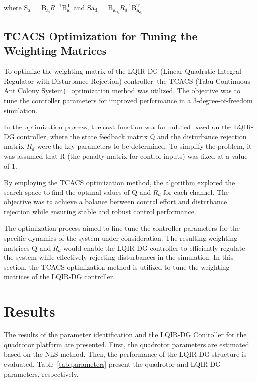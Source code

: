 \documentclass[3p]{elsarticle}
\begin{document}
where $
    \boldsymbol{\mathrm{S_{a_i}}} = \boldsymbol{\mathrm{B_{a_i}}}R^{-1}\boldsymbol{\mathrm{B}^\mathrm{T}_{a_i}}$ and $
    \boldsymbol{\mathrm{S{a_{d_i}}}} = \boldsymbol{\mathrm{B}_{a_{d_i}}}R_{d}^{-1}\boldsymbol{\mathrm{B}^\mathrm{T}_{a_{d_i}}}.
$%

\subsection{TCACS Optimization for Tuning the Weighting Matrices}
\noindent To optimize the weighting matrix of the LQIR-DG (Linear Quadratic Integral Regulator with Disturbance Rejection) controller, the TCACS (Tabu Continuous Ant Colony System)~\cite{10.1007/978-3-540-28646-2_27} optimization method was utilized. The objective was to tune the controller parameters for improved performance in a 3-degree-of-freedom simulation.

In the optimization process, the cost function was formulated based on the LQIR-DG controller, where the state feedback matrix $\boldsymbol{\mathrm{Q}}$ and the disturbance rejection matrix $R_d$ were the key parameters to be determined. To simplify the problem, it was assumed that R (the penalty matrix for control inputs) was fixed at a value of 1.

By employing the TCACS optimization method, the algorithm explored the search space to find the optimal values of $\boldsymbol{\mathrm{Q}}$ and $R_d$ for each channel. The objective was to achieve a balance between control effort and disturbance rejection while ensuring stable and robust control performance.

The optimization process aimed to fine-tune the controller parameters for the specific dynamics of the system under consideration. The resulting weighting matrices $\boldsymbol{\mathrm{Q}}$ and $R_d$ would enable the LQIR-DG controller to efficiently regulate the system while effectively rejecting disturbances in the simulation.
\noindent In this section, the TCACS optimization method is utilized to tune the weighting matrices of the LQIR-DG controller. 
\section{Results}\label{sec:results}
\noindent The results of the parameter identification and the LQIR-DG Controller for the quadrotor platform are presented. First, the quadrotor parameters are estimated based on the NLS method. Then, the performance of the LQIR-DG structure is evaluated.
Table~\ref{tab:parameters} present the quadrotor and LQIR-DG parameters, respectively.
\end{document}
